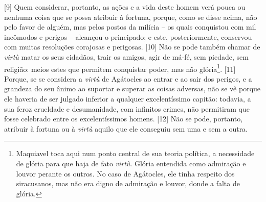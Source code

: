 {[}9{]} Quem considerar, portanto, as ações e a vida deste homem verá
pouca ou nenhuma coisa que se possa atribuir à fortuna, porque, como se
disse acima, não pelo favor de alguém, mas pelos postos da milícia -- os
quais conquistou com mil incômodos e perigos -- alcançou o principado; e
este, posteriormente, conservou com muitas resoluções corajosas e
perigosas. {[}10{]} Não se pode também chamar de \emph{virtù} matar os
seus cidadãos, trair os amigos, agir de má-fé, sem piedade, sem
religião: meios estes que permitem conquistar poder, mas não
glória\footnote{Maquiavel toca aqui num ponto central de sua teoria
  política, a necessidade de glória para que haja de fato \emph{virtù}.
  Glória entendida como admiração e louvor perante os outros. No caso de
  Agátocles, ele tinha respeito dos siracusanos, mas não era digno de
  admiração e louvor, donde a falta de glória.}. {[}11{]} Porque, se se
considera a \emph{virtù} de Agátocles ao entrar e ao sair dos perigos, e
a grandeza do seu ânimo ao suportar e superar as coisas adversas, não se
vê porque ele haveria de ser julgado inferior a qualquer excelentíssimo
capitão: todavia, a sua feroz crueldade e desumanidade, com infinitos
crimes, não permitiram que fosse celebrado entre os excelentíssimos
homens. {[}12{]} Não se pode, portanto, atribuir à fortuna ou à
\emph{virtù} aquilo que ele conseguiu sem uma e sem a outra.

